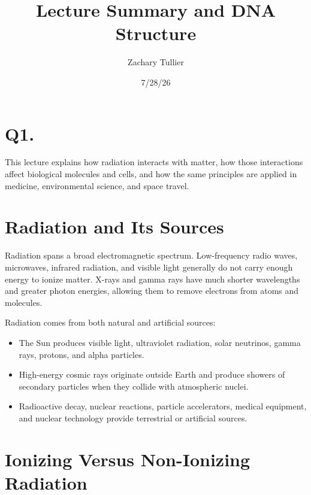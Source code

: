 \documentclass[12pt]{article}
\title{Lecture Summary and DNA Structure}
\author{Zachary Tullier}
\date{7/28/26}
\begin{document}
\maketitle

\section*{Q1. }

This lecture explains how radiation interacts with matter, how those
interactions affect biological molecules and cells, and how the same
principles are applied in medicine, environmental science, and space travel.

\section{Radiation and Its Sources}

Radiation spans a broad electromagnetic spectrum. Low-frequency radio waves,
microwaves, infrared radiation, and visible light generally do not carry enough
energy to ionize matter. X-rays and gamma rays have much shorter wavelengths
and greater photon energies, allowing them to remove electrons from atoms and
molecules.

Radiation comes from both natural and artificial sources:

\begin{itemize}
    \item The Sun produces visible light, ultraviolet radiation, solar
    neutrinos, gamma rays, protons, and alpha particles.
    \item High-energy cosmic rays originate outside Earth and produce showers
    of secondary particles when they collide with atmospheric nuclei.
    \item Radioactive decay, nuclear reactions, particle accelerators, medical
    equipment, and nuclear technology provide terrestrial or artificial
    sources.
\end{itemize}

\section{Ionizing Versus Non-Ionizing Radiation}
\end{document}
